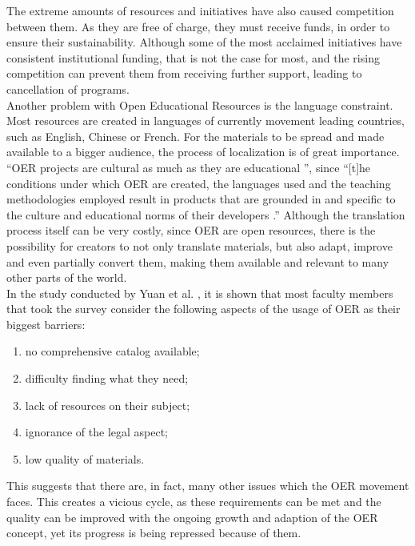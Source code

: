 \documentclass[a4paper]{article}
\begin{document}
\noindent
The extreme amounts of resources and initiatives have also caused competition between them. As they are free of charge, they must receive funds, in order to ensure their sustainability. Although some of the most acclaimed initiatives have consistent institutional funding, that is not the case for most, and the rising competition can prevent them from receiving further support, leading to cancellation of programs. \\

\noindent
Another problem with Open Educational Resources is the language constraint. Most resources are created in languages of currently movement leading countries, such as English, Chinese or French. For the materials to be spread and made available to a bigger audience, the process of localization is of great importance. ``OER projects are cultural as much as they are educational \cite[p.14]{higher-ed}'', since ``[t]he conditions under which OER are created, the languages used and the teaching methodologies employed result in products that are grounded in and specific to the culture and educational norms of their developers \cite[p.14]{higher-ed}.'' Although the translation process itself can be very costly, since OER are open resources, there is the possibility for creators to not only translate materials, but also adapt, improve and even partially convert them, making them available and relevant to many other parts of the world.\\

\noindent
In the study conducted by Yuan et al. \cite{higher-ed}, it is shown that most faculty members that took the survey consider the following aspects of the usage of OER as their biggest barriers:

\begin{enumerate}
\item no comprehensive catalog available;
\item difficulty finding what they need;
\item lack of resources on their subject;
\item ignorance of the legal aspect;
\item low quality of materials.
\end{enumerate}

\noindent
This suggests that there are, in fact, many other issues which the OER movement faces. This creates a vicious cycle, as these requirements can be met and the quality can be improved with the ongoing growth and adaption of the OER concept, yet its progress is being repressed because of them. 
\end{document}
